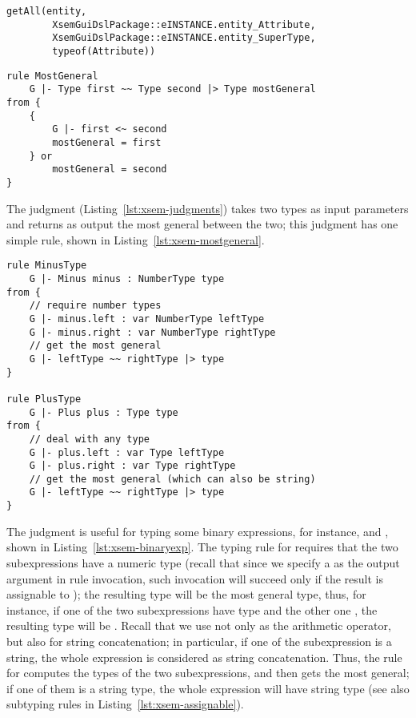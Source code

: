 \begin{lstlisting}[language=xsemantics] 
	getAll(entity, 
		XsemGuiDslPackage::eINSTANCE.entity_Attribute,
		XsemGuiDslPackage::eINSTANCE.entity_SuperType,
		typeof(Attribute))
\end{lstlisting}

\begin{lstlisting}[language=xsemantics,float,label=lst:xsem-mostgeneral,caption=Rule
for \mytt{mostGeneral}.] 
rule MostGeneral
	G |- Type first ~~ Type second |> Type mostGeneral
from {
	{
		G |- first <~ second
		mostGeneral = first
	} or
		mostGeneral = second
}
\end{lstlisting}

The judgment  (Listing~\ref{lst:xsem-judgments}) takes two
types as input parameters and returns as output the most general between the
two; this judgment has one simple rule, shown in
Listing~\ref{lst:xsem-mostgeneral}.

\begin{lstlisting}[language=xsemantics,float,label=lst:xsem-binaryexp,caption=Some
rules for binary expressions.] 
rule MinusType
	G |- Minus minus : NumberType type
from {
	// require number types
	G |- minus.left : var NumberType leftType
	G |- minus.right : var NumberType rightType
	// get the most general
	G |- leftType ~~ rightType |> type
}

rule PlusType
	G |- Plus plus : Type type
from {
	// deal with any type
	G |- plus.left : var Type leftType
	G |- plus.right : var Type rightType
	// get the most general (which can also be string)
	G |- leftType ~~ rightType |> type
}
\end{lstlisting}

The judgment  is useful for typing some binary expressions,
for instance,  and , shown in
Listing~\ref{lst:xsem-binaryexp}.  The typing rule for  requires
that the two subexpressions have a numeric type (recall that since we specify a
 as the output argument in rule invocation, such invocation
will succeed only if the result is assignable to ); the
resulting type will be the most general type, thus, for instance, if one of the
two subexpressions have type  and the other one ,
the resulting type will be .  Recall that we use \mytt{+} not
only as the arithmetic operator, but also for string concatenation; in
particular, if one of the subexpression is a string, the whole expression is
considered as string concatenation.  Thus, the rule for  computes the
types of the two subexpressions, and then gets the most general; if one of them
is a string type, the whole expression will have string type (see also subtyping
rules in Listing~\ref{lst:xsem-assignable}).

